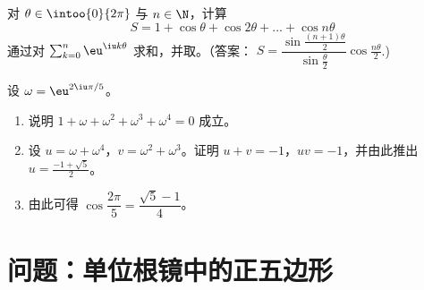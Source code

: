 \begin{exercise}[$\star\star\star$]\label{exo:g12:complex:9}
对 $\theta \in \intoo{0}{2\pi}$ 与 $n \in \N$，计算
\[
S = 1 + \cos\theta + \cos 2\theta + \dots + \cos n\theta
\]
通过对
$\sum_{k=0}^n \eu^{\iu k\theta}$ 求和，并取。（答案：
$S = \dfrac{\sin\frac{(n+1)\theta}{2}}{\sin\frac{\theta}{2}}
\cos\frac{n\theta}{2}$.)
\end{exercise}

\begin{exercise}[$\star\star\star$]\label{exo:g12:complex:10}
设 $\omega = \eu^{2\iu\pi/5}$。
\begin{enumerate}
  \item 说明 $1 + \omega + \omega^2 + \omega^3 + \omega^4 = 0$ 成立。
  \item 设 $u = \omega + \omega^4$，$v = \omega^2 + \omega^3$。证明
        $u + v = -1$，$uv = -1$，并由此推出 $u = \frac{-1+\sqrt5}{2}$。
  \item 由此可得 $\cos\dfrac{2\pi}{5} = \dfrac{\sqrt5 - 1}{4}$。
\end{enumerate}
\end{exercise}

\section{问题：单位根镜中的正五边形}

